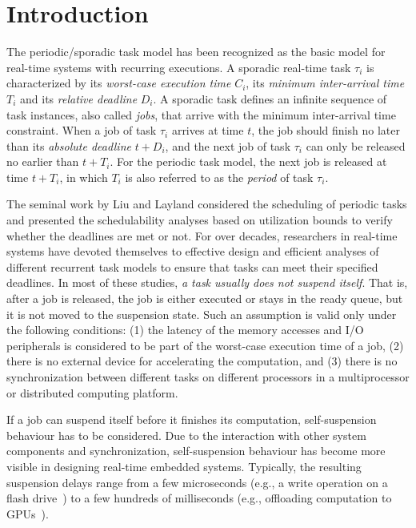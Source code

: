 \section{Introduction}

The periodic/sporadic task model has been recognized as the basic
model for real-time systems with recurring executions.  A sporadic
real-time task $\tau_i$ is characterized by its \emph{worst-case execution
time} $C_i$, its \emph{minimum
  inter-arrival time} $T_i$ and its
\emph{relative deadline} $D_i$. A sporadic task defines an infinite
sequence of task instances, also called \emph{jobs}, that arrive with
the minimum inter-arrival time constraint. When a job of task $\tau_i$
arrives at time $t$, the job should finish no later than its
\emph{absolute deadline} $t+D_i$, and the next job of task $\tau_i$
can only be released no earlier than $t+T_i$. For the periodic task
model, the next job is released at time $t+T_i$, in which $T_i$ is
also referred to as the \emph{period} of task $\tau_i$.


The seminal work by Liu and Layland \cite{Liu_1973} considered the
scheduling of periodic tasks and presented the schedulability analyses
based on utilization bounds to verify whether the deadlines are met or
not.  For over decades, researchers in real-time systems have
devoted themselves to effective design and efficient analyses of
different recurrent task models to ensure that tasks can meet their
specified deadlines. In most of these studies, \emph{a task usually does not
 suspend itself}. That is, after a job is released, the job
is either executed or stays in the ready queue, but it is not moved to
the suspension state.  Such an assumption is valid only under the
following conditions: (1) the latency of the memory accesses and I/O
peripherals is considered to be part of the worst-case execution time
of a job, (2) there is no external device for accelerating the
computation, and (3) there is no synchronization between different
tasks on different processors in a multiprocessor or distributed
computing platform.


If a job can suspend itself before it finishes its computation,
self-suspension behaviour has to be considered. Due to the interaction
with other system components and synchronization, self-suspension
behaviour has become more visible in designing real-time embedded
systems.  Typically, the resulting suspension delays range from a few
microseconds (e.g., a write operation on a flash
drive~\cite{Kang:rtss07}) to a few hundreds of milliseconds (e.g.,
offloading computation to GPUs~\cite{Kato_2011,Liu_2014}).

